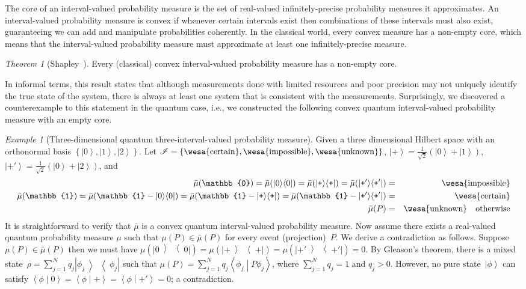 \documentclass{article}
\theoremstyle{remark}
\newtheorem{example}{Example}
\newtheorem{thm}{Theorem}
\newcommand{\imposs}{{\mbox{\wesa{impossible}}}}
\newcommand{\necess}{{\mbox{\wesa{certain}}}}
\newcommand{\unknown}{{\mbox{\wesa{unknown}}}}
\newcommand{\ket}[1]{{\left\vert{#1}\right\rangle}}
\newcommand{\op}[2]{\ensuremath{\left\vert{#1}\middle\rangle\middle\langle{#2}\right\vert}}
\newcommand{\proj}[1]{\op{#1}{#1}}
\newcommand{\ps}{\texttt{+}}
\newcommand{\ip}[2]{\ensuremath{\left\langle{#1}\middle\vert{#2}\right\rangle}}
\begin{document}
\noindent The core of an interval-valued probability measure is the
set of real-valued infinitely-precise probability measures it
approximates. An interval-valued probability measure is convex if
whenever certain intervals exist then combinations of these intervals
must also exist, guaranteeing we can add and manipulate probabilities
coherently. In the classical world, every convex measure has a
non-empty core, which means that the interval-valued probability
measure must approximate at least one infinitely-precise measure.

\begin{thm}[Shapley~\cite{Shapley1971,,Grabisch2016}]\label{thm:Shapley}
  Every (classical) convex interval-valued probability measure has a
  non-empty core.
\end{thm}

In informal terms, this result states that although measurements done
with limited resources and poor precision may not uniquely identify
the true state of the system, there is always at least one system that
is consistent with the measurements. Surprisingly, we discovered a
counterexample to this statement in the quantum case, i.e., we
constructed the following convex quantum interval-valued probability
measure with an empty core.

\begin{example}[Three-dimensional quantum three-interval-valued
probability measure]\label{ex:three-dimensional-three-value} Given
a three dimensional Hilbert space with an orthonormal basis $\left\{ \ket{0},\ket{1},\ket{2}\right\} $.
Let $\mathscr{I}=\left\{ \necess,\imposs,\unknown\right\} $, $\ket{\ps}=\frac{1}{\sqrt{2}}(\ket{0}+\ket{1})$,
$\ket{\ps'}=\frac{1}{\sqrt{2}}(\ket{0}+\ket{2})$, and 
\begin{eqnarray*}
\bar{\mu}(\mathbb{0})=\bar{\mu}(\proj{0})=\bar{\mu}(\proj{\ps})=\bar{\mu}(\proj{\ps'}) & = & \imposs\\
\bar{\mu}(\mathbb{1})=\bar{\mu}(\mathbb{1}-\proj{0})=\bar{\mu}(\mathbb{1}-\proj{\ps})=\bar{\mu}(\mathbb{1}-\proj{\ps'}) & = & \necess\\
\bar{\mu}(P) & = & \unknown\quad\textrm{otherwise}
\end{eqnarray*}
It is straightforward to verify that $\bar{\mu}$ is a convex quantum
interval-valued probability measure. Now assume there exists a real-valued
quantum probability measure $\mu$ such that $\mu(P)\in\bar{\mu}(P)$
for every event (projection)~$P$. We derive a contradiction as follows.
Suppose $\mu(P)\in\bar{\mu}(P)$ then we must have $\mu(\proj{0})=\mu(\proj{\ps})=\mu(\proj{\ps'})=0$.
By Gleason's theorem, there is a mixed state~$\rho=\sum_{j=1}^{N}q_{j}\proj{\phi_{j}}$
such that $\mu\left(P\right)=\sum_{j=1}^{N}q_{j}\ip{\phi_{j}}{P\phi_{j}}$,
where $\sum_{j=1}^{N}q_{j}=1$ and $q_{j}>0$. However, no pure state~$\ket{\phi}$
can satisfy $\ip{\phi}{0}=\ip{\phi}{\ps}=\ip{\phi}{\ps'}=0$; a contradiction.
\end{example}
\end{document}
